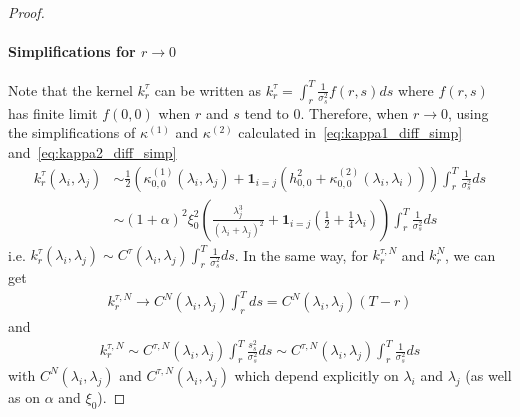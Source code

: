 \documentclass[11pt]{article}
\begin{document}
\begin{proof}
\paragraph{Simplifications for $r \to 0$}
Note that the kernel $k^\tau_r$ can be written as $k^\tau_r = \int_r^T \frac{1}{\sigma_s^2} f(r,s)ds$  where $f(r,s)$ has finite limit $f(0,0)$ when $r$ and $s$ tend to $0$. Therefore, when $r\to0$, using the simplifications of $\kappa^{(1)}$ and $\kappa^{(2)}$ calculated in~\eqref{eq:kappa1_diff_simp} and~\eqref{eq:kappa2_diff_simp} 
\begin{align*}
    k_r^\tau (\lambda_i, \lambda_j) &\sim \frac12\left(\kappa^{(1)}_{0,0}(\lambda_i, \lambda_j) +  \mathbf{1}_{i=j} \left( h_{0,0}^2 + \kappa^{(2)}_{0,0}(\lambda_i, \lambda_i) \right) \right) \int_r^T \frac{1}{\sigma_s^2} ds \\
    &\sim  (1+\alpha)^2 \xi_0^2 \left( \frac{\lambda_j^3}{(\lambda_i + \lambda_j)^2} + \mathbf{1}_{i=j}\left(\frac12 + \frac14 \lambda_i\right) \right)\int_r^T \frac{1}{\sigma_s^2} ds
\end{align*}
i.e. $ k_r^\tau (\lambda_i, \lambda_j) \sim C^{\tau}(\lambda_i, \lambda_j) \int_r^T \frac{1}{\sigma_s^2} ds$.
In the same way, for $k^{\tau,N}_r$ and $k^{N}_r$, we can get 
\begin{align*}
    k^{\tau,N}_r \to C^{N}(\lambda_i, \lambda_j)\int_r^T ds = C^{N}(\lambda_i, \lambda_j)(T-r)
\end{align*}
and 
\begin{align*}
    k^{\tau,N}_r \sim C^{\tau,N}(\lambda_i, \lambda_j)\int_r^T \frac{s_s^2}{\sigma_s^2} ds \sim C^{\tau,N}(\lambda_i, \lambda_j) \int_r^T \frac{1}{\sigma_s^2} ds
\end{align*}
with $C^{N}(\lambda_i, \lambda_j)$ and $C^{\tau,N}(\lambda_i, \lambda_j)$ which depend explicitly on $\lambda_i$ and $\lambda_j$ (as well as on $\alpha$ and $\xi_0$).
\end{proof}
\end{document}
